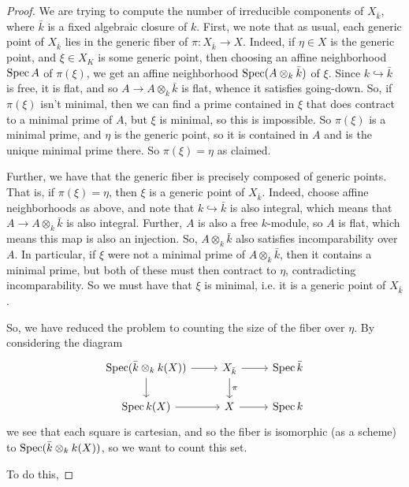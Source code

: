 \begin{proof}
	We are trying to compute the number of irreducible components of $X_{\bar{k}}$, where $\bar{k}$ is a fixed algebraic closure of $k$. First, we note that as usual, each generic point of $X_{\bar{k}}$ lies in the generic fiber of $\pi : X_{\bar{k}} \to X$. Indeed, if $\eta \in X$ is the generic point, and $\xi \in X_K$ is some generic point, then choosing an affine neighborhood $\operatorname{Spec} A$ of $\pi(\xi)$, we get an affine neighborhood $\operatorname{Spec}(A \otimes_k \bar{k})$ of $\xi$. Since $k \hookrightarrow \bar{k}$ is free, it is flat, and so $A \to A \otimes_k \bar{k}$ is flat, whence it satisfies going-down. So, if $\pi(\xi)$ isn't minimal, then we can find a prime contained in $\xi$ that does contract to a minimal prime of $A$, but $\xi$ is minimal, so this is impossible. So $\pi(\xi)$ is a minimal prime, and $\eta$ is the generic point, so it is contained in $A$ and is the unique minimal prime there. So $\pi(\xi) = \eta$ as claimed.
	
	Further, we have that the generic fiber is precisely composed of generic points. That is, if $\pi(\xi) = \eta$, then $\xi$ is a generic point of $X_{\bar{k}}$. Indeed, choose affine neighborhoods as above, and note that $k \hookrightarrow \bar{k}$ is also integral, which means that $A \to A \otimes_k \bar{k}$ is also integral. Further, $A$ is also a free $k$-module, so $A$ is flat, which means this map is also an injection. So, $A \otimes_k \bar{k}$ also satisfies incomparability over $A$. In particular, if $\xi$ were not a minimal prime of $A \otimes_k \bar{k}$, then it contains a minimal prime, but both of these must then contract to $\eta$, contradicting incomparability. So we must have that $\xi$ is minimal, i.e. it is a generic point of $X_{\bar{k}}$.
	
	So, we have reduced the problem to counting the size of the fiber over $\eta$. By considering the diagram
	\[ \begin{tikzcd} \Spec(\bar{k} \otimes_k k(X)) \arrow[r] \arrow[d] & X_{\bar{k}} \arrow[r] \arrow[d,"\pi"] & \Spec \bar{k} \\ \Spec k(X) \arrow[r] & X \arrow[r] & \Spec k \end{tikzcd} \]
	we see that each square is cartesian, and so the fiber is isomorphic (as a scheme) to $\operatorname{Spec}(\bar{k} \otimes_k k(X))$, so we want to count this set.
	
	To do this,
\end{proof}
